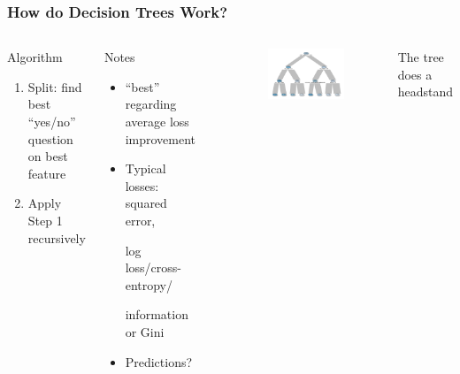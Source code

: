\documentclass[
    utf8,
    aspectratio=169
]{beamer}  %
\begin{document}
\begin{frame}
	\frametitle{How do Decision Trees Work?}
	\begin{columns}[onlytextwidth]
		\begin{block}{Algorithm}
			\begin{enumerate}
				\item Split: find best ``yes/no'' question on best feature		
				\item Apply Step 1 recursively
			\end{enumerate}
		\end{block}
	
		\begin{exampleblock}{Notes}
			\begin{itemize}
				\item ``best'' regarding average loss improvement
				\item Typical losses: squared error, 
				
				log loss/cross-entropy/ 
				
				information or Gini
				\item Predictions?
			\end{itemize}
		\end{exampleblock}
	
		\begin{example}
		\end{example}
	
		\begin{figure}
			\includegraphics[width=1\textwidth]{pics/tree.pdf}
		\end{figure}
		\centering The tree does a headstand
	\end{columns}
\end{frame}
\end{document}
